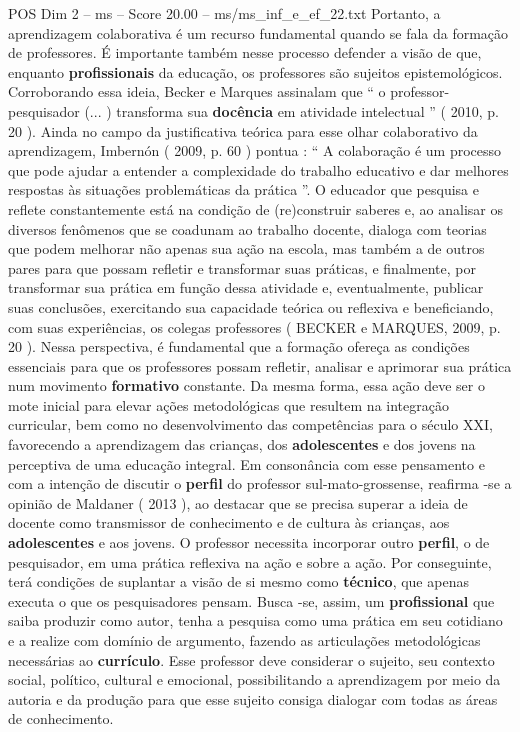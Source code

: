 \begin{textsample}{POS Dim 2 – ms – Score 20.00 – ms/ms\_inf\_e\_ef\_22.txt}
Portanto, a aprendizagem colaborativa é um recurso fundamental quando se fala da formação de professores.
É importante também nesse processo defender a visão de que, enquanto \textbf{profissionais} da educação, os professores são sujeitos epistemológicos.
Corroborando essa ideia, Becker e Marques assinalam que “ o professor-pesquisador (... ) transforma sua \textbf{docência} em atividade intelectual ” ( 2010, p. 20 ).
Ainda no campo da justificativa teórica para esse olhar colaborativo da aprendizagem, Imbernón ( 2009, p. 60 ) pontua : “ A colaboração é um processo que pode ajudar a entender a complexidade do trabalho educativo e dar melhores respostas às situações problemáticas da prática ”.
O educador que pesquisa e reflete constantemente está na condição de (re)construir saberes e, ao analisar os diversos fenômenos que se coadunam ao trabalho docente, dialoga com teorias que podem melhorar não apenas sua ação na escola, mas também a de outros pares para que possam refletir e transformar suas práticas, e finalmente, por transformar sua prática em função dessa atividade e, eventualmente, publicar suas conclusões, exercitando sua capacidade teórica ou reflexiva e beneficiando, com suas experiências, os colegas professores ( BECKER e MARQUES, 2009, p. 20 ).
Nessa perspectiva, é fundamental que a formação ofereça as condições essenciais para que os professores possam refletir, analisar e aprimorar sua prática num movimento \textbf{formativo} constante.
Da mesma forma, essa ação deve ser o mote inicial para elevar ações metodológicas que resultem na integração curricular, bem como no desenvolvimento das competências para o século XXI, favorecendo a aprendizagem das crianças, dos \textbf{adolescentes} e dos jovens na perceptiva de uma educação integral.
Em consonância com esse pensamento e com a intenção de discutir o \textbf{perfil} do professor sul-mato-grossense, reafirma -se a opinião de Maldaner ( 2013 ), ao destacar que se precisa superar a ideia de docente como transmissor de conhecimento e de cultura às crianças, aos \textbf{adolescentes} e aos jovens.
O professor necessita incorporar outro \textbf{perfil}, o de pesquisador, em uma prática reflexiva na ação e sobre a ação.
Por conseguinte, terá condições de suplantar a visão de si mesmo como \textbf{técnico}, que apenas executa o que os pesquisadores pensam.
Busca -se, assim, um \textbf{profissional} que saiba produzir como autor, tenha a pesquisa como uma prática em seu cotidiano e a realize com domínio de argumento, fazendo as articulações metodológicas necessárias ao \textbf{currículo}.
Esse professor deve considerar o sujeito, seu contexto social, político, cultural e emocional, possibilitando a aprendizagem por meio da autoria e da produção para que esse sujeito consiga dialogar com todas as áreas de conhecimento.

\end{textsample}
